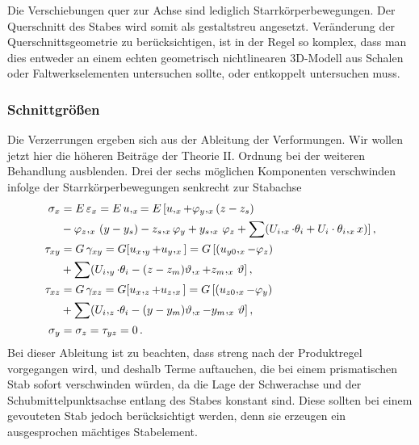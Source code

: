 Die Verschiebungen quer zur Achse sind lediglich Starrk\"{o}rperbewegungen. Der Querschnitt des Stabes wird somit als gestaltstreu angesetzt. Ver\"{a}nderung der Querschnittsgeometrie zu ber\"{u}cksichtigen, ist in der Regel so komplex, dass man dies entweder an einem echten geometrisch nichtlinearen 3D-Modell aus Schalen oder Faltwerkselementen untersuchen sollte, oder entkoppelt untersuchen muss.

{\textcolor{sectionTitleBlue}{\subsubsection*{Schnittgr\"{o}{\ss}en}}}

Die Verzerrungen ergeben sich aus der Ableitung der Verformungen. Wir wollen jetzt hier die h\"{o}heren Beitr\"{a}ge der Theorie II. Ordnung bei der weiteren Behandlung ausblenden. Drei der sechs m\"{o}glichen Komponenten verschwinden infolge der Starrk\"{o}rperbewegungen senkrecht zur Stabachse
\begin{subequations}
\begin{align}
\sigma_x &= E\,\varepsilon_x = E\,u,_x = E\,[u,_x + \varphi_y,_x (z - z_s) \nonumber \\
& - \varphi_z,_x\,(y - y_s) - z_s,_x \varphi_y + y_s,_x \,\varphi_z + \sum(U_i,_x
\cdot \theta_i + U_i \cdot \theta_i,_x x) ]\,,\\
\tau_{xy} &= G\,\gamma_{xy} = G [ u_x,_y +
u_y,_x] = G\,[(u_{y0},_x - \varphi_z)\nonumber \\
&+ \sum (U_i,_y\cdot \theta_i - (z - z_m)
\vartheta,_x + z_m,_x\,\vartheta ]\,,\\ \nonumber
\tau_{xz} &= G\,\gamma_{xz} = G [ u_x,_z +
u_z,_x] = G\,[(u_{z0},_x - \varphi_y) \nonumber\\
&+ \sum ( U_i,_z \cdot \theta_i - (y - y_m) \vartheta,_x
- y_m,_x\,\vartheta ]\,,\\
\sigma_y &= \sigma_z = \tau_{yz} = 0\,.
\end{align}
\end{subequations}
Bei dieser Ableitung ist zu beachten, dass streng nach der Produktregel vorgegangen wird, und deshalb Terme auftauchen, die bei einem prismatischen Stab sofort verschwinden w\"{u}rden, da die Lage der Schwerachse und der Schubmittelpunktsachse entlang des Stabes konstant sind. Diese sollten bei einem gevouteten Stab jedoch ber\"{u}cksichtigt werden, denn sie erzeugen ein ausgesprochen m\"{a}chtiges Stabelement.


